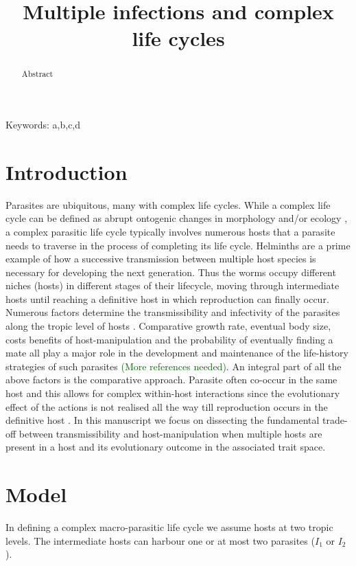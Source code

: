 \documentclass{article}
\title{\vspace*{-22mm}\bf Multiple infections and complex life cycles}
\date{}
\newcommand{\cha}[1]{\textcolor{darkgreen}{(#1)}}
\begin{document}
\linenumbers
\maketitle


\begin{abstract}
Abstract
\end{abstract}


\noindent
Keywords: a,b,c,d


\tableofcontents

\section{Introduction}

Parasites are ubiquitous, many with complex life cycles.
While a complex life cycle can be defined as abrupt ontogenic changes in morphology and/or ecology \cite{Benesh:2016dj}, a complex parasitic life cycle typically involves numerous hosts that a parasite needs to traverse in the process of completing its life cycle.
Helminths are a prime example of how a successive transmission between multiple host species is necessary for developing the next generation.
Thus the worms occupy different niches (hosts) in different stages of their lifecycle, moving through intermediate hosts until reaching a definitive host in which reproduction can finally occur.
Numerous factors determine the transmissibility and infectivity of the parasites along the tropic level of hosts \cite{froelick:PRSB:2021}.
Comparative growth rate, eventual body size, costs benefits of host-manipulation and the probability of eventually finding a mate all play a major role in the development and maintenance of the life-history strategies of such parasites \cha{More references needed}.
An integral part of all the above factors is the comparative approach.
Parasite often co-occur in the same host and this allows for complex within-host interactions since the evolutionary effect of the actions is not realised all the way till reproduction occurs in the definitive host \cite{Hafer:2015gl}.
In this manuscript we focus on dissecting the fundamental trade-off between transmissibility and host-manipulation when multiple hosts are present in a host and its evolutionary outcome in the associated trait space.


\section{Model}

In defining a complex macro-parasitic life cycle we assume hosts at two tropic levels.
The intermediate hosts can harbour one or at most two parasites ($I_1$ or $I_2$).
\end{document}
